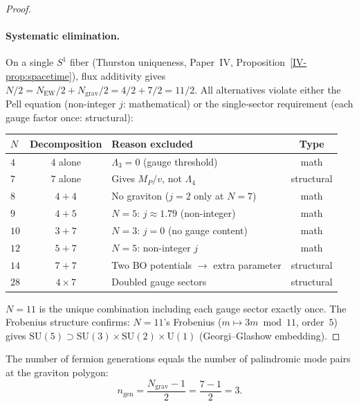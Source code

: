 \begin{proof}
\paragraph{Systematic elimination.}
On a single $S^1$ fiber (Thurston uniqueness,
Paper~IV, Proposition~\ref*{IV-prop:spacetime}),
flux additivity gives
$N/2 = N_{\mathrm{EW}}/2 + N_{\mathrm{grav}}/2 = 4/2 + 7/2 = 11/2$.
All alternatives violate either the Pell equation
(non-integer $j$: mathematical) or the single-sector
requirement (each gauge factor once: structural):
\begin{center}\small
\begin{tabular}{lclc}
\toprule
$N$ & Decomposition & Reason excluded & Type \\
\midrule
$4$  & $4$ alone      & $\Lambda_3 = 0$ (gauge threshold) & math \\
$7$  & $7$ alone      & Gives $M_P/v$, not $\Lambda_4$ & structural \\
$8$  & $4+4$          & No graviton ($j{=}2$ only at $N{=}7$) & math \\
$9$  & $4+5$          & $N=5$: $j \approx 1.79$ (non-integer) & math \\
$10$ & $3+7$          & $N=3$: $j=0$ (no gauge content) & math \\
$12$ & $5+7$          & $N=5$: non-integer $j$ & math \\
$14$ & $7+7$          & Two BO potentials $\to$ extra parameter & structural \\
$28$ & $4 \times 7$   & Doubled gauge sectors & structural \\
\bottomrule
\end{tabular}
\end{center}
\noindent
$N = 11$ is the unique combination including each gauge
sector exactly once.
The Frobenius structure confirms:
$N = 11$'s Frobenius ($m \mapsto 3m \bmod 11$, order~$5$)
gives $\mathrm{SU}(5) \supset \mathrm{SU}(3) \times \mathrm{SU}(2)
\times \mathrm{U}(1)$ (Georgi--Glashow embedding).
\end{proof}

\begin{corollary}
\label{cor:3-gen}
The number of fermion generations equals the number of
palindromic mode pairs at the graviton polygon:
\begin{equation}\label{eq:n-gen}
  n_{\mathrm{gen}} = \frac{N_{\mathrm{grav}} - 1}{2} = \frac{7 - 1}{2} = 3.
\end{equation}
\end{corollary}

